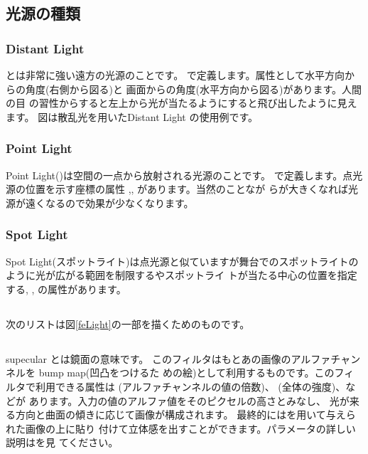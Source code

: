 \subsection{光源の種類}
\subsubsection{Distant Light}
とは非常に強い遠方の光源のことです。
で定義します。属性として水平方向からの角度(右側から図る)と
画面からの角度(水平方向から図る)があります。人間の目
の習性からすると左上から光が当たるようにすると飛び出したように見えます。
図は散乱光を用いたDistant Light の使用例です。
\subsubsection{Point Light}
Point Light()は空間の一点から放射される光源のことです。
で定義します。点光源の位置を示す座標の属性
,, があります。当然のことなが
らが大きくなれば光源が遠くなるので効果が少なくなります。
\subsubsection{Spot Light}
Spot Light(スポットライト)は点光源と似ていますが舞台でのスポットライトの
ように光が広がる範囲を制限するやスポットライ
トが当たる中心の位置を指定する, ,
 の属性があります。
\subsection{}
次のリストは図\ref{feLight}の一部を描くためのものです。
\subsection{}
supecular とは鏡面の意味です。
このフィルタはもとあの画像のアルファチャンネルを bump map(凹凸をつけるた
めの絵)として利用するものです。このフィルタで利用できる属性は
(アルファチャンネルの値の倍数)、
(全体の強度)、などが
あります。入力の値のアルファ値をそのピクセルの高さとみなし、
光が来る方向と曲面の傾きに応じて画像が構成されます。
最終的にはを用いて与えられた画像の上に貼り
付けて立体感を出すことができます。パラメータの詳しい説明は\cite{SVG11}を見
てください。

